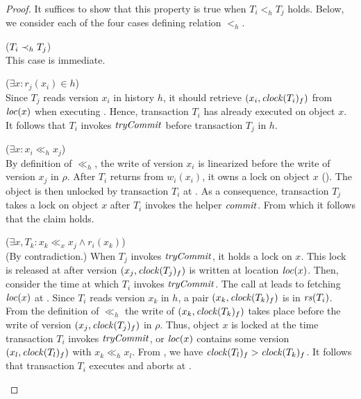 \begin{proof}
  It suffices to show that this property is true when $T_i <_h T_j$ holds.
  Below, we consider each of the four cases defining relation $<_h$.
  \begin{compactitem}
  \item ($T_i \hb_h T_j$)\\
    This case is immediate.
  \item ($\exists x : r_j(x_i) \in h$)\\
    Since $T_j$ reads version $x_i$ in history $h$, it should retrieve $(x_i,\clockOf{T_i}_f)$ from $\locationOf{x}$ when executing .
    Hence, transaction $T_i$ has already executed  on object $x$.
    It follows that $T_i$ invokes $\stmTryCommitFunction$ before transaction $T_j$ in $h$.
  \item ($\exists x : x_i \ll_h x_j$)\\
    By definition of $\ll_h$, the write of version $x_i$ is linearized before the write of version $x_j$ in $\rho$.
    After $T_i$ returns from $w_i(x_i)$, it owns a lock on object $x$ ().
    The object is then unlocked by transaction $T_i$ at .
    As a consequence, transaction $T_j$ takes a lock on object $x$ after $T_i$ invokes the helper $\stmCommitFunction$.
    From which it follows that the claim holds.
  \item ($\exists x, T_k : x_k \ll_x x_j \land r_i(x_k)$)\\
    (By contradiction.)
    When $T_j$ invokes $\stmTryCommitFunction$, it holds a lock on $x$.
    This lock is released at  after version $(x_j,\clockOf{T_j}_f)$ is written at location $\locationOf{x}$.
    Then, consider the time at which $T_i$ invokes $\stmTryCommitFunction$.
    The call at  leads to fetching $\locationOf{x}$ at .
    Since $T_i$ reads version $x_k$ in $h$, a pair $(x_k,\clockOf{T_k}_f)$ is in $\readSetOf{T_i}$.
    From the definition of $\ll_h$ the write of $(x_k,\clockOf{T_k}_f)$ takes place before the write of version $(x_j,\clockOf{T_j}_f)$ in $\rho$.
    Thus, object $x$ is locked at the time transaction $T_i$ invokes $\stmTryCommitFunction$, or $\locationOf{x}$ contains some version $(x_l,\clockOf{T_l}_f)$ with $x_k \ll_h x_l$.
    From , we have $\clockOf{T_l}_f > \clockOf{T_k}_f$.
    It follows that transaction $T_i$ executes  and aborts at .
  \end{compactitem}
\end{proof}

